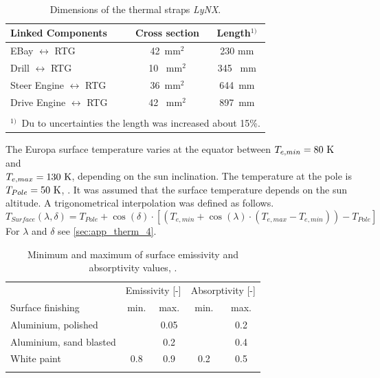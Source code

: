 \begin{table}[H]
	\centering
	\caption{Dimensions of the thermal straps \textit{LyNX}\textsuperscript{\tiny\textregistered}.}
	\begin{tabular}{l@{\quad}cc}
		\toprule
		Linked Components & Cross section  & Length$^{1)}$  \\ \midrule
		EBay $\leftrightarrow$ RTG & 42\ mm$^2$ & 230 mm  \\[0.25em] 
		Drill $\leftrightarrow$ RTG &10 \ mm$^2$ &345 \ mm \\[0.25em] 
		Steer Engine $\leftrightarrow$ RTG & 36\ mm$^2$&644\ mm  \\[0.25em] 
		Drive Engine $\leftrightarrow$ RTG &42 \ mm$^2$&897\ mm  \\[0.25em] \bottomrule
		& &   \\[-0.5em]
		\multicolumn{3}{l}{$^{1)}$\ Du to uncertainties the length was increased about 15\%.}\\[1em]
	\end{tabular}
	\label{tab:tcs_lynx}
\end{table}

The Europa surface temperature varies at the  equator between $T_{e,min}=80~{\rm K}$ and\\ $T_{e,max}=130~{\rm K}$, depending on the sun inclination.
The temperature at the pole is ${T_{Pole}=50~{\rm K}}$, \cite{Europa}.
It was assumed that the surface temperature depends on the sun altitude.
A trigonometrical interpolation was defined as follows.
\[ T_{Surface}(\lambda, \delta) = T_{Pole} + \cos (\delta) \cdot [(T_{e,min}+\cos (\lambda)\cdot (T_{e,max}-T_{e,min}))-T_{Pole}] \]
For $\lambda$ and $\delta$ see \autoref{sec:app_therm_4}.\\

\begin{table}[H]
	\centering
	\caption{Minimum and maximum of surface emissivity and absorptivity values, \cite{ref_tcs_05}.}
	\begin{tabular}{l@{\qquad\qquad}cc@{\qquad\qquad}cc}
		\toprule
		& \multicolumn{2}{l}{Emissivity [-]} & \multicolumn{2}{l}{Absorptivity [-]}  \\ 
		Surface finishing	&	min. & max. 	&	min. & max.   \\\midrule
		Aluminium, polished & &0.05  & & 0.2   \\
		Aluminium, sand blasted & &0.2  & & 0.4   \\
		White paint & 0.8 & 0.9 & 0.2 & 0.5  \\ \bottomrule
		& & & & \\
	\end{tabular}
	\label{tab:tcs_surface}
\end{table}


